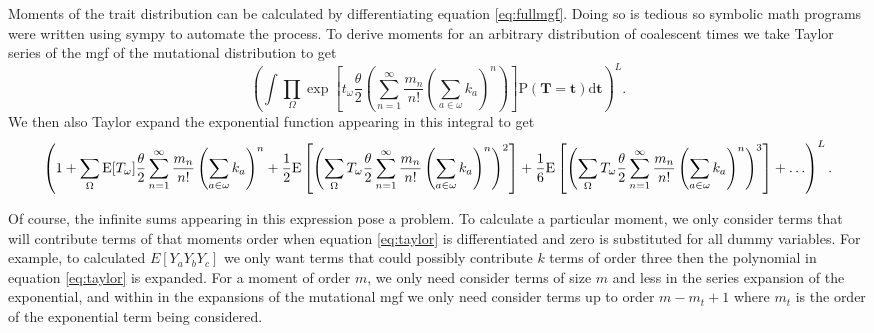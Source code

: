 Moments of the trait distribution can be calculated by differentiating equation
\eqref{eq:fullmgf}. Doing so is tedious so symbolic math programs were written
using sympy \citep{sympy} to automate the process. To derive moments for an
arbitrary distribution of coalescent times we take Taylor series of the mgf of
the mutational distribution to get
\begin{equation}
  \left(\int \prod_{\Omega} \exp\left[ t_{\omega} \frac{\theta}{2} \left(
    \sum_{n=1}^{\infty} \frac{m_n}{n!} \left( \sum_{a \in \omega} k_a \right)^n
    \right) \right] \mathrm{P}(\mathbf{T} = \mathbf{t}) \mathrm{d}\mathbf{t} \right)^L.
\end{equation}
We then also Taylor expand the exponential function appearing in this integral to get
\begin{equation} \label{eq:taylor}
  \tiny
  \left( 1 + \sum_{\Omega} \mathrm{E}[T_\omega] \frac{\theta}{2}
  \sum_{n=1}^{\infty} \frac{m_n}{n!} \left( \sum_{a \in \omega} k_a \right)^n +
  \frac{1}{2} \mathrm{E} \left[ \left( \sum_{\Omega} T_\omega \frac{\theta}{2}
    \sum_{n=1}^{\infty} \frac{m_n}{n!} \left( \sum_{a \in \omega} k_a
    \right)^n\right)^2 \right] + \frac{1}{6} \mathrm{E}\left[\left(
    \sum_{\Omega} T_\omega \frac{\theta}{2} \sum_{n=1}^{\infty} \frac{m_n}{n!}
    \left( \sum_{a \in \omega} k_a \right)^n \right)^3\right] + \ldots \right)^L.
\end{equation}

Of course, the infinite sums appearing in this expression pose a problem. To
calculate a particular moment, we only consider terms that will contribute terms
of that moments order when equation \eqref{eq:taylor} is differentiated and
zero is substituted for all dummy variables. For example, to calculated
$E[Y_aY_bY_c]$ we only want terms that could possibly contribute $k$ terms of
order three then the polynomial in equation \eqref{eq:taylor} is expanded. For
a moment of order $m$, we only need consider terms of size $m$ and less in the
series expansion of the exponential, and within in the expansions of the
mutational mgf we only need consider terms up to order $m-m_t+1$ where $m_t$ is
the order of the exponential term being considered.
